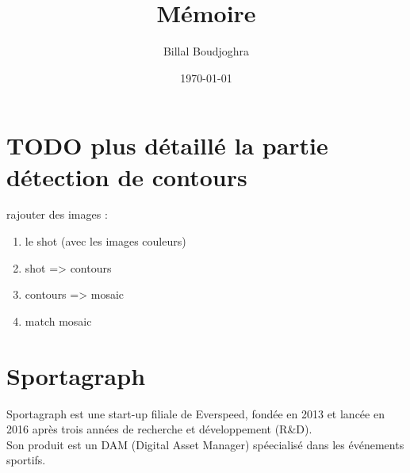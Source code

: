 \documentclass[11pt]{article}
\author{Billal Boudjoghra}
\date{\today}
\title{Mémoire}
\begin{document}
\maketitle
\tableofcontents

\newpage
\section{{\bfseries\sffamily TODO} plus détaillé la partie détection de contours}
\label{sec:org187d640}
rajouter des images :\\
\begin{enumerate}
\item le shot (avec les images couleurs)\\
\item shot => contours\\
\item contours => mosaic\\
\item match mosaic\\
\end{enumerate}
\section{Sportagraph}
\label{sec:orgee6330b}
Sportagraph est une start-up filiale de Everspeed, fondée en 2013 et lancée en 2016 après trois années de recherche et développement (R\&D).\\
Son produit est un DAM (Digital Asset Manager) spéecialisé dans les événements sportifs.\\
\end{document}
